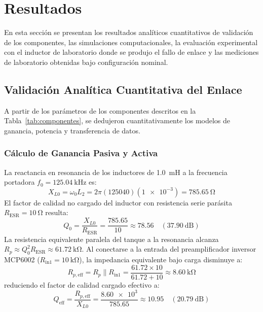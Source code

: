 \section{Resultados}
\label{sec:resultados}

En esta sección se presentan los resultados analíticos cuantitativos de validación de los componentes, las simulaciones computacionales, la evaluación experimental con el inductor de laboratorio donde se produjo el fallo de enlace y las mediciones de laboratorio obtenidas bajo configuración nominal.

\subsection{Validación Analítica Cuantitativa del Enlace}
\label{subsec:calculos_analiticos}

A partir de los parámetros de los componentes descritos en la Tabla~\ref{tab:componentes}, se dedujeron cuantitativamente los modelos de ganancia, potencia y transferencia de datos.

\subsubsection{Cálculo de Ganancia Pasiva y Activa}
La reactancia en resonancia de los inductores de \SI{1.0}{\milli\henry} a la frecuencia portadora $f_0 = \SI{125.04}{\kilo\hertz}$ es:
\begin{equation}
    X_{L0} = \omega_0 L_2 = 2\pi (125040)(\num{1e-3}) = \SI{785.65}{\ohm}
\end{equation}
El factor de calidad no cargado del inductor con resistencia serie parásita $R_{\text{ESR}} = \SI{10}{\ohm}$ resulta:
\begin{equation}
    Q_0 = \frac{X_{L0}}{R_{\text{ESR}}} = \frac{785.65}{10} \approx 78.56 \quad (\SI{37.90}{\deci\bel})
\end{equation}
La resistencia equivalente paralela del tanque a la resonancia alcanza $R_p \approx Q_0^2 R_{\text{ESR}} \approx \SI{61.72}{\kilo\ohm}$. Al conectarse a la entrada del preamplificador inversor MCP6002 ($R_{\text{in1}} = \SI{10}{\kilo\ohm}$), la impedancia equivalente bajo carga disminuye a:
\begin{equation}
    R_{p,\text{eff}} = R_p \parallel R_{\text{in1}} = \frac{61.72 \times 10}{61.72 + 10} \approx \SI{8.60}{\kilo\ohm}
\end{equation}
reduciendo el factor de calidad cargado efectivo a:
\begin{equation}
    Q_{\text{eff}} = \frac{R_{p,\text{eff}}}{X_{L0}} = \frac{\num{8.60e3}}{785.65} \approx 10.95 \quad (\SI{20.79}{\deci\bel})
\end{equation}

